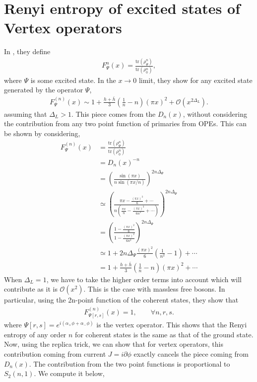 \documentclass[11pt]{article}
\newcommand{\p}{\partial}
\newcommand{\mO}{\mathcal{O}}
\newcommand{\lb}{\left(}
\newcommand{\rb}{\right)}
\begin{document}
\section{Renyi entropy of excited states of Vertex operators}
In \cite{Alcaraz_2011}, they define 
\begin{align}
    F_{\Psi}^n(x) = \frac{\text{tr}(\rho_\Psi^n)}{\text{tr}(\rho_0^n)},
\end{align}
where $\Psi$ is some excited state. 
In the $x \to 0 $ limit, they show for any excited state generated by the operator $\Psi$,
\begin{align}
    F_\Psi^{(n)}(x) \sim 1+ \frac{h+\bar{h}}{3} \lb\frac{1}{n}-n\rb (\pi x)^2 + \mO(x^{2\Delta_{L}}).
\end{align}
assuming that $\Delta_L>1$.
This piece comes from the $D_n(x)$, without considering the contribution from any two point function of primaries from OPEs. This can be shown by considering,
\begin{align}
    F^{(n)}_\Psi(x) &= \frac{\text{tr}(\rho_\Psi^n)}{\text{tr}(\rho_0^n)} \\
    &= D_n(x)^{-n} \\
    &= \lb\frac{\sin(\pi x)}{n\sin(\pi x/n)}\rb^{2n\Delta_\Psi} \\
    &\simeq \lb\frac{\pi x -\frac{(\pi x)^3}{6} + \cdots } {n \lb \frac{\pi x }{n} - \frac{(\pi x)^3}{6n^3} + \cdots\rb  }\rb^{2n\Delta_\Psi}\\
    &= \lb \frac{1 - \frac{(\pi x)^2}{6}}{1- \frac{(\pi x)^2}{6n^2}}  \rb^{2n\Delta_\Psi} \\
    &\simeq 1+ 2n\Delta_\Psi \frac{(\pi x)^2}{6}\lb\frac{1}{n^2} - 1\rb + \cdots \\
    &= 1+ \frac{h + \bar{h}}{3} \lb\frac{1}{n}-n\rb (\pi x)^2 + \cdots
\end{align}
When $\Delta_L = 1$, we have to take the higher order terms into account which will contribute as it is $\mO(x^2)$. This is the case with massless free bosons. 
In particular, using the 2n-point function of the coherent states, they show that 
\begin{align}
    F^{(n)}_{\Psi[r,s]}(x) = 1, \qquad \forall n,r,s. 
\end{align} 
where $\Psi[r,s] = e^{i (\alpha_+ \phi + \alpha_- \phi)}$
is the vertex operator. This shows that the Renyi entropy of any order $n$ for coherent states is the same as that of the ground state. 
Now, using the replica trick, we can show that for vertex operators, this contribution coming from current $J = i \p \phi$ exactly cancels the piece coming from $D_n(x)$. The contribution from the two point functions is proportional to $S_2(n,1)$. We compute it below,
\end{document}
